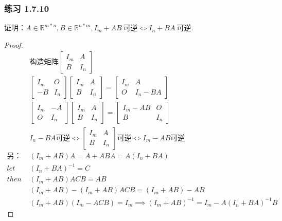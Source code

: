 \documentclass[11pt,a4paper,oneside,fontset=windows]{ctexbook}
\begin{document}
\subsubsection{练习 1.7.10}
证明：$A\in\mathbb{R}^{m*n},B\in\mathbb{R}^{n*m}, I_m+AB\ \text{可逆} \iff I_n+BA\ \text{可逆}$.
\begin{proof}
  \begin{align*}
                  & \text{构造矩阵} \begin{bmatrix} I_m  &A \\ B &I_n \end{bmatrix}                       \\
                  & \begin{bmatrix} I_m  &O \\-B  &I_n\end{bmatrix}
    \begin{bmatrix} I_m  &A \\  B  &I_n\end{bmatrix}=
    \begin{bmatrix} I_m  &A \\  O  &I_n-BA\end{bmatrix}                                                       \\
                  & \begin{bmatrix} I_m  &-A \\ O  &I_n\end{bmatrix}
    \begin{bmatrix} I_m  &A \\ B  &I_n\end{bmatrix}=
    \begin{bmatrix} I_m-AB  &O \\ B  &I_n\end{bmatrix}                                                       \\
                  & I_n-BA\text{可逆}\iff
    \begin{bmatrix} I_m &A \\ B &I_n\end{bmatrix}\text{可逆} \iff I_m-AB \text{可逆}                   \\
    \text{另：\ } & (I_m+AB)A=A+ABA=A(I_n+BA)                                       \\
    let\          & (I_n+BA)^{-1}=C                                                 \\
    then\         & (I_m+AB)ACB=AB                                                  \\
                  & (I_m+AB)-(I_m+AB)ACB=(I_m+AB)-AB                                \\
                  & (I_m+AB)(I_m-ACB)=I_m\implies (I_m+AB)^{-1}=I_m-A(I_n+BA)^{-1}B
  \end{align*}
\end{proof}
\end{document}
